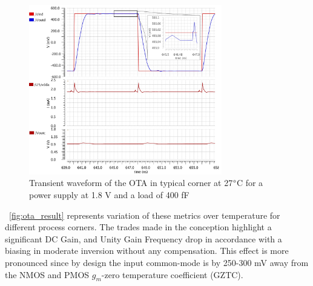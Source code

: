 \begin{figure}[htp]
    \centering
    \includegraphics[width=0.75\textwidth]{Chapter7/Figs/ota_transient_settling.jpg}
    \caption{Transient waveform of the OTA in typical corner at 27$\degree$C for a power supply at 1.8 V and a load of 400 fF}
    \label{fig:ota_settling_transient}
\end{figure}


\figurename~\ref{fig:ota_result} represents variation of these metrics over temperature for different process corners. The trades made in the conception highlight a significant DC Gain, and Unity Gain Frequency drop in accordance with a biasing in moderate inversion without any compensation. This effect is more pronounced since by design the input common-mode is by 250-300 mV away from the NMOS and PMOS \(g_m \)-zero temperature coefficient (GZTC).

